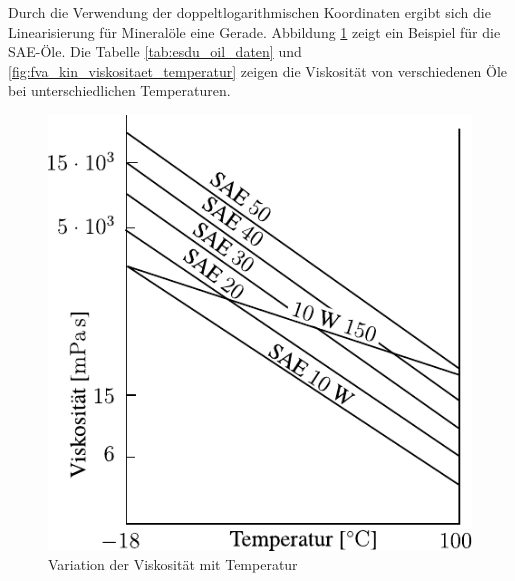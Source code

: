 Durch die Verwendung der doppeltlogarithmischen Koordinaten ergibt sich die Linearisierung für Mineralöle eine Gerade.
Abbildung \ref{fig:variation_der_viskositaet_mit_temperatur} zeigt ein Beispiel für die SAE-Öle.
Die Tabelle \ref{tab:esdu_oil_daten} und \ref{fig:fva_kin_viskositaet_temperatur} zeigen die Viskosität von verschiedenen Öle bei unterschiedlichen Temperaturen.
\begin{figure}[htb]
    \centering
    \includegraphics[]{./images/visko_temperatur.pdf}
    \caption{Variation der Viskosität mit Temperatur \cite{gohar_1988}}
    \label{fig:variation_der_viskositaet_mit_temperatur}
\end{figure}

